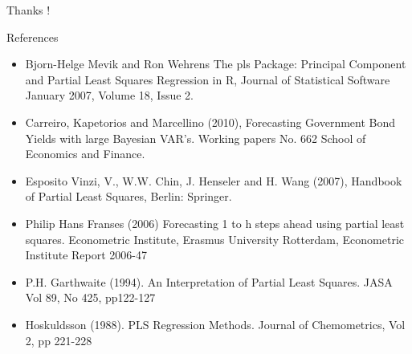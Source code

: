 \documentclass{beamer}
\newcommand{\?}{?`}
\begin{document}
\begin{frame}{}
  \begin{block}{}
    \begin{center}
      \vspace{3mm}
      {\Large Thanks !}\\
      \vspace{3mm}
    \end{center}
  \end{block}
\end{frame}



\begin{frame}{References}
\begin{footnotesize}
    \begin{itemize}
\item Bjorn-Helge Mevik and Ron Wehrens The pls Package: Principal Component and Partial Least Squares Regression in R,
Journal of Statistical Software January 2007, Volume 18, Issue 2.
\item Carreiro, Kapetorios and Marcellino (2010), Forecasting Government Bond Yields with large Bayesian VAR's.
Working papers No. 662 School of Economics and Finance.
\item Esposito Vinzi, V., W.W. Chin, J. Henseler and H. Wang (2007), Handbook of
Partial Least Squares, Berlin: Springer.
\item Philip Hans Franses (2006) Forecasting 1 to h steps ahead using partial least squares.
Econometric Institute, Erasmus University Rotterdam, Econometric Institute Report 2006-47
\item P.H. Garthwaite (1994). An Interpretation of Partial Least Squares. JASA Vol 89, No 425, pp122-127
\item Hoskuldsson (1988). PLS Regression Methods. Journal of Chemometrics, Vol 2, pp 221-228
  \end{itemize}
 \end{footnotesize}
\end{frame}
\end{document}
